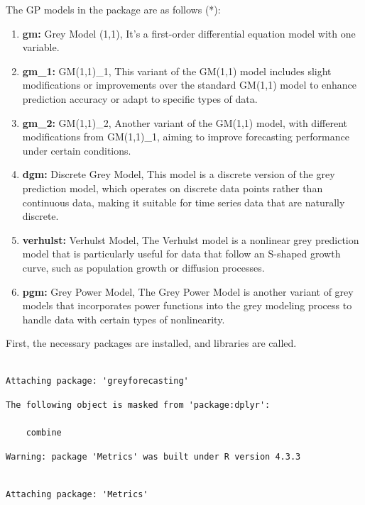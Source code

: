 \documentclass[
  11pt,
  a4paper,
  DIV=11,
  numbers=noendperiod]{scrartcl}
\begin{document}
The GP models in the package are as follows (*):

\begin{enumerate}
\def\labelenumi{\arabic{enumi}.}
\item
  \textbf{gm:} Grey Model (1,1), It's a first-order differential
  equation model with one variable.
\item
  \textbf{gm\_1:} GM(1,1)\_1, This variant of the GM(1,1) model includes
  slight modifications or improvements over the standard GM(1,1) model
  to enhance prediction accuracy or adapt to specific types of data.
\item
  \textbf{gm\_2:} GM(1,1)\_2, Another variant of the GM(1,1) model, with
  different modifications from GM(1,1)\_1, aiming to improve forecasting
  performance under certain conditions.
\item
  \textbf{dgm:} Discrete Grey Model, This model is a discrete version of
  the grey prediction model, which operates on discrete data points
  rather than continuous data, making it suitable for time series data
  that are naturally discrete.
\item
  \textbf{verhulst:} Verhulst Model, The Verhulst model is a nonlinear
  grey prediction model that is particularly useful for data that follow
  an S-shaped growth curve, such as population growth or diffusion
  processes.
\item
  \textbf{pgm:} Grey Power Model, The Grey Power Model is another
  variant of grey models that incorporates power functions into the grey
  modeling process to handle data with certain types of nonlinearity.
\end{enumerate}

First, the necessary packages are installed, and libraries are called.

\begin{verbatim}

Attaching package: 'greyforecasting'
\end{verbatim}

\begin{verbatim}
The following object is masked from 'package:dplyr':

    combine
\end{verbatim}

\begin{verbatim}
Warning: package 'Metrics' was built under R version 4.3.3
\end{verbatim}

\begin{verbatim}

Attaching package: 'Metrics'
\end{verbatim}
\end{document}
